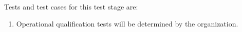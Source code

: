 Tests and test cases for this test stage are:
\begin{enumerate}[itemindent=5pt,topsep=0pt,itemsep=0pt,partopsep=0pt, parsep=0pt]
	
	\item {\bf \TBD} Operational qualification tests will be determined  by the \StageOT organization.

\end{enumerate}